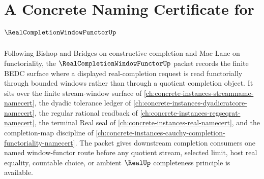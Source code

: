 \chapter{A Concrete Naming Certificate for $\RealCompletionWindowFunctorUp$}
\label{ch:concrete-instances-real-completion-window-functor-namecert}

Following Bishop and Bridges on constructive completion and Mac Lane on functoriality, the $\RealCompletionWindowFunctorUp$ packet records the finite BEDC surface where a displayed real-completion request is read functorially through bounded windows rather than through a quotient completion object. It sits over the finite stream-window surface of \autoref{ch:concrete-instances-streamname-namecert}, the dyadic tolerance ledger of \autoref{ch:concrete-instances-dyadicratcore-namecert}, the regular rational readback of \autoref{ch:concrete-instances-regseqrat-namecert}, the terminal Real seal of \autoref{ch:concrete-instances-real-namecert}, and the completion-map discipline of \autoref{ch:concrete-instances-cauchy-completion-functoriality-namecert}. The packet gives downstream completion consumers one named window-functor route before any quotient stream, selected limit, host real equality, countable choice, or ambient $\RealUp$ completeness principle is available.

